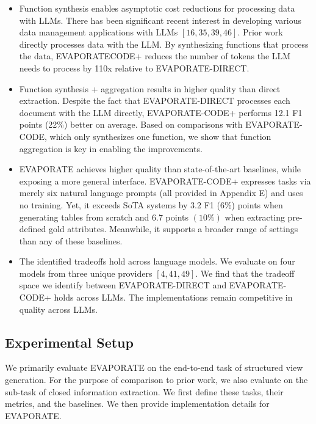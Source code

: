 \documentclass[10pt]{article}
\begin{document}
\begin{itemize}
  \item Function synthesis enables asymptotic cost reductions for processing data with LLMs. There has been significant recent interest in developing various data management applications with LLMs $[16,35,39,46]$. Prior work directly processes data with the LLM. By synthesizing functions that process the data, EVAPORATECODE+ reduces the number of tokens the LLM needs to process by 110x relative to EVAPORATE-DIRECT.

  \item Function synthesis + aggregation results in higher quality than direct extraction. Despite the fact that EVAPORATE-DIRECT processes each document with the LLM directly, EVAPORATE-CODE+ performs 12.1 F1 points (22\%) better on average. Based on comparisons with EVAPORATE-CODE, which only synthesizes one function, we show that function aggregation is key in enabling the improvements.

  \item EVAPORATE achieves higher quality than state-of-the-art baselines, while exposing a more general interface. EVAPORATE-CODE+ expresses tasks via merely six natural language prompts (all provided in Appendix E) and uses no training. Yet, it exceeds SoTA systems by 3.2 F1 (6\%) points when generating tables from scratch and 6.7 points $(10 \%)$ when extracting pre-defined gold attributes. Meanwhile, it supports a broader range of settings than any of these baselines.

  \item The identified tradeoffs hold across language models. We evaluate on four models from three unique providers $[4,41,49]$. We find that the tradeoff space we identify between EVAPORATE-DIRECT and EVAPORATE-CODE+ holds across LLMs. The implementations remain competitive in quality across LLMs.

\end{itemize}

\subsection{Experimental Setup}
We primarily evaluate EVAPORATE on the end-to-end task of structured view generation. For the purpose of comparison to prior work, we also evaluate on the sub-task of closed information extraction. We first define these tasks, their metrics, and the baselines. We then provide implementation details for EVAPORATE.
\end{document}
